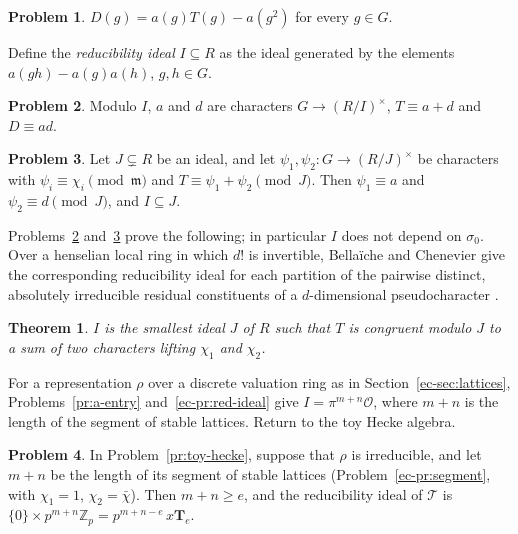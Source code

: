 \documentclass[reqno]{amsart}
\theoremstyle{definition}
\newtheorem{problem}{Problem}[section]
\theoremstyle{plain}
\newtheorem{theorem}{Theorem}[section]
\newcommand{\Z}{\mathbb{Z}}
\newcommand{\Zp}{\Z_p}
\newcommand{\Oc}{\mathcal{O}}
\newcommand{\Tb}{\mathbf{T}}
\begin{document}
\begin{problem}\label{pr:D-a}
\(D(g) = a(g)T(g) - a(g^2)\) for every \(g \in G\).
\end{problem}

Define the \emph{reducibility ideal} \(I \subseteq R\) as the ideal generated by the elements \(a(gh) - a(g)a(h)\), \(g, h \in G\).

\begin{problem}\label{pr:mod-I}
Modulo \(I\), \(a\) and \(d\) are characters \(G \to (R/I)^\times\), \(T \equiv a + d\) and \(D \equiv ad\).
\end{problem}

\begin{problem}\label{pr:minimal}
Let \(J \subsetneq R\) be an ideal, and let \(\psi_1, \psi_2 \colon G \to (R/J)^\times\) be characters with \(\psi_i \equiv \chi_i \pmod{\mathfrak m}\) and \(T \equiv \psi_1 + \psi_2 \pmod J\).  Then \(\psi_1 \equiv a\) and \(\psi_2 \equiv d \pmod J\), and \(I \subseteq J\).
\end{problem}

Problems~\ref{pr:mod-I} and~\ref{pr:minimal} prove the following; in particular \(I\) does not depend on \(\sigma_0\).  Over a henselian local ring in which \(d!\) is invertible, Bellaïche and Chenevier give the corresponding reducibility ideal for each partition of the pairwise distinct, absolutely irreducible residual constituents of a \(d\)-dimensional pseudocharacter \cite[Prop.~1.5.1]{BC}.

\begin{theorem}\label{thm:red}
\(I\) is the smallest ideal \(J\) of \(R\) such that \(T\) is congruent modulo \(J\) to a sum of two characters lifting \(\chi_1\) and \(\chi_2\).
\end{theorem}

For a representation \(\rho\) over a discrete valuation ring as in Section~\ref{ec-sec:lattices}, Problems~\ref{pr:a-entry} and~\ref{ec-pr:red-ideal} give \(I = \pi^{m+n}\Oc\), where \(m + n\) is the length of the segment of stable lattices.  Return to the toy Hecke algebra.

\begin{problem}\label{pr:I-toy}
In Problem~\ref{pr:toy-hecke}, suppose that \(\rho\) is irreducible, and let \(m + n\) be the length of its segment of stable lattices (Problem~\ref{ec-pr:segment}, with \(\chi_1 = 1\), \(\chi_2 = \bar\chi\)).  Then \(m + n \ge e\), and the reducibility ideal of \(\mathcal{T}\) is \(\{0\} \times p^{m+n}\Zp = p^{m+n-e}\, x\Tb_e\).
\end{problem}
\end{document}
